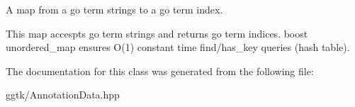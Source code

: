 A map from a go term strings to a go term index. 

This map accespts go term strings and returns go term indices. boost unordered\+\_\+map ensures O(1) constant time find/has\+\_\+key queries (hash table). 

The documentation for this class was generated from the following file\+:\begin{DoxyCompactItemize}
\item 
ggtk/Annotation\+Data.\+hpp\end{DoxyCompactItemize}
